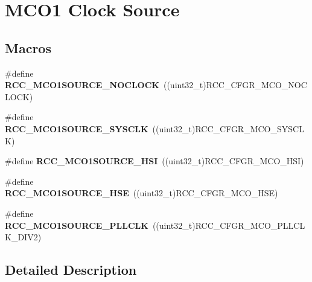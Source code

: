 \hypertarget{group___r_c_c_ex___m_c_o1___clock___source}{}\section{M\+C\+O1 Clock Source}
\label{group___r_c_c_ex___m_c_o1___clock___source}
\subsection*{Macros}
\begin{DoxyCompactItemize}
\item 
\mbox{\label{group___r_c_c_ex___m_c_o1___clock___source_ga725a16362f3324ef5866dc5a1ff07cf5}} 
\#define {\bfseries R\+C\+C\+\_\+\+M\+C\+O1\+S\+O\+U\+R\+C\+E\+\_\+\+N\+O\+C\+L\+O\+CK}~((uint32\+\_\+t)R\+C\+C\+\_\+\+C\+F\+G\+R\+\_\+\+M\+C\+O\+\_\+\+N\+O\+C\+L\+O\+CK)
\item 
\mbox{\label{group___r_c_c_ex___m_c_o1___clock___source_gae8ca2959a1252ecd319843da02c79526}} 
\#define {\bfseries R\+C\+C\+\_\+\+M\+C\+O1\+S\+O\+U\+R\+C\+E\+\_\+\+S\+Y\+S\+C\+LK}~((uint32\+\_\+t)R\+C\+C\+\_\+\+C\+F\+G\+R\+\_\+\+M\+C\+O\+\_\+\+S\+Y\+S\+C\+LK)
\item 
\mbox{\label{group___r_c_c_ex___m_c_o1___clock___source_gad99c388c455852143220397db3730635}} 
\#define {\bfseries R\+C\+C\+\_\+\+M\+C\+O1\+S\+O\+U\+R\+C\+E\+\_\+\+H\+SI}~((uint32\+\_\+t)R\+C\+C\+\_\+\+C\+F\+G\+R\+\_\+\+M\+C\+O\+\_\+\+H\+SI)
\item 
\mbox{\label{group___r_c_c_ex___m_c_o1___clock___source_ga5582d2ab152eb440a6cc3ae4833b043f}} 
\#define {\bfseries R\+C\+C\+\_\+\+M\+C\+O1\+S\+O\+U\+R\+C\+E\+\_\+\+H\+SE}~((uint32\+\_\+t)R\+C\+C\+\_\+\+C\+F\+G\+R\+\_\+\+M\+C\+O\+\_\+\+H\+SE)
\item 
\mbox{\label{group___r_c_c_ex___m_c_o1___clock___source_ga79d888f2238eaa4e4b8d02b3900ea18b}} 
\#define {\bfseries R\+C\+C\+\_\+\+M\+C\+O1\+S\+O\+U\+R\+C\+E\+\_\+\+P\+L\+L\+C\+LK}~((uint32\+\_\+t)R\+C\+C\+\_\+\+C\+F\+G\+R\+\_\+\+M\+C\+O\+\_\+\+P\+L\+L\+C\+L\+K\+\_\+\+D\+I\+V2)
\end{DoxyCompactItemize}


\subsection{Detailed Description}
